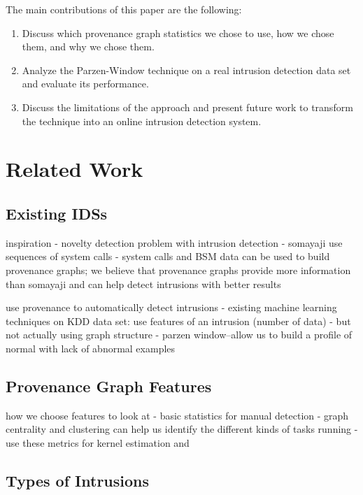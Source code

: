 \documentclass[10pt,twocolumn]{article}
\begin{document}
The main contributions of this paper are the following:
\begin{enumerate}
\item Discuss which provenance graph statistics we chose to use, how we chose them, and why we chose them.
\item Analyze the Parzen-Window technique on a real intrusion detection data set and evaluate its performance.
\item Discuss the limitations of the approach and present future work to transform the technique into an online intrusion detection system.
\end{enumerate}


%

\section{Related Work}

\subsection{Existing IDSs}

inspiration
- novelty detection problem with intrusion detection
- somayaji use sequences of system calls
- system calls and BSM data can be used to build provenance graphs; we believe that
provenance graphs provide more information than somayaji and can help detect
intrusions with better results

use provenance to automatically detect intrusions
- existing machine learning techniques on KDD data set: use features of an intrusion (number of data)
- but not actually using graph structure
- parzen window--allow us to build a profile of normal with lack of abnormal examples

\subsection{Provenance Graph Features}

how we choose features to look at
- basic statistics for manual detection
- graph centrality and clustering can help us identify the different kinds of tasks running
- use these metrics for kernel estimation and 

\subsection{Types of Intrusions}
\end{document}
